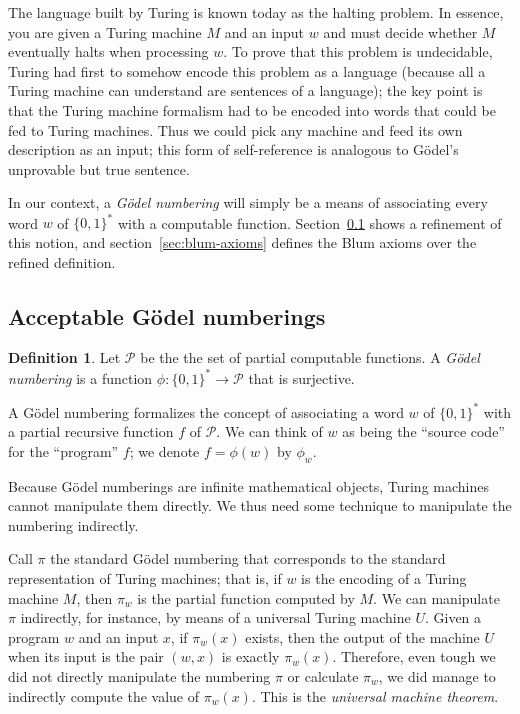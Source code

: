 \documentclass[12pt]{article}
\theoremstyle{definition}
\newtheorem{definition}{Definition}
\begin{document}
The language built by Turing is known today as the halting problem.
In essence,
you are given a Turing machine $M$ and an input $w$
and must decide whether $M$ eventually halts when processing $w$.
To prove that this problem is undecidable,
Turing had first to somehow encode this problem as a language
(because all a Turing machine can understand are sentences of a language);
the key point is that the Turing machine formalism
had to be encoded into words that could be fed to Turing machines.
Thus we could pick any machine and feed its own description as an input;
this form of self-reference is analogous
to Gödel's unprovable but true sentence.

In our context,
a \emph{Gödel numbering} will simply be a means
of associating every word $w$ of $\{0, 1\}^*$
with a computable function.
Section~\ref{sec:acceptable-godel-numberings} shows a refinement of this notion,
and section~\ref{sec:blum-axioms}
defines the Blum axioms over the refined definition.

\subsection{Acceptable Gödel numberings}
\label{sec:acceptable-godel-numberings}

\begin{definition}
    Let $\mathcal P$ be the the set of partial computable functions.
    A \emph{Gödel numbering}
    is a function $\phi: \{0, 1\}^* \to \mathcal P$
    that is surjective.
\end{definition}

A Gödel numbering formalizes the concept of associating a word $w$ of $\{0, 1\}^*$
with a partial recursive function $f$ of $\mathcal P$.
We can think of $w$ as being the ``source code'' for the ``program'' $f$;
we denote $f = \phi(w)$ by $\phi_w$.

Because Gödel numberings are infinite mathematical objects,
Turing machines cannot manipulate them directly.
We thus need some technique to manipulate the numbering indirectly.

Call $\pi$ the standard Gödel numbering
that corresponds to the standard representation of Turing machines;
that is, if $w$ is the encoding of a Turing machine $M$,
then $\pi_w$ is the partial function computed by $M$.
We can manipulate $\pi$ indirectly, for instance,
by means of a universal Turing machine $U$.
Given a program $w$ and an input $x$,
if $\pi_w(x)$ exists,
then the output of the machine $U$ when its input is the pair $(w, x)$
is exactly $\pi_w(x)$.
Therefore,
even tough we did not directly manipulate the numbering $\pi$
or calculate $\pi_w$,
we did manage to indirectly compute the value of $\pi_w(x)$.
This is the \emph{universal machine theorem}.
\end{document}
